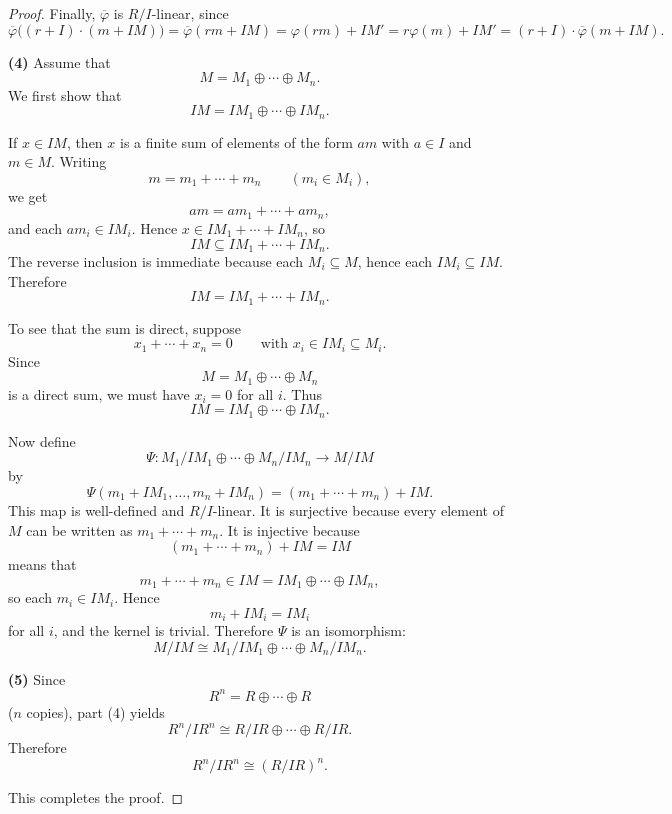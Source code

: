 \begin{proof}
    Finally, $\overline{\varphi}$ is $R/I$-linear, since
    \[
        \overline{\varphi}\bigl((r+I)\cdot (m+IM)\bigr)
        =\overline{\varphi}(rm+IM)
        =\varphi(rm)+IM'
        =r\varphi(m)+IM'
        =(r+I)\cdot \overline{\varphi}(m+IM).
    \]

    \textbf{(4)} Assume that
    \[
        M=M_1\oplus\cdots\oplus M_n.
    \]
    We first show that
    \[
        IM=IM_1\oplus\cdots\oplus IM_n.
    \]

    If $x\in IM$, then $x$ is a finite sum of elements of the form $am$ with $a\in I$ and $m\in M$. Writing
    \[
        m=m_1+\cdots+m_n
        \qquad (m_i\in M_i),
    \]
    we get
    \[
        am=am_1+\cdots+am_n,
    \]
    and each $am_i\in IM_i$. Hence $x\in IM_1+\cdots+IM_n$, so
    \[
        IM\subseteq IM_1+\cdots+IM_n.
    \]
    The reverse inclusion is immediate because each $M_i\subseteq M$, hence each $IM_i\subseteq IM$. Therefore
    \[
        IM=IM_1+\cdots+IM_n.
    \]

    To see that the sum is direct, suppose
    \[
        x_1+\cdots+x_n=0
        \qquad\text{with } x_i\in IM_i\subseteq M_i.
    \]
    Since
    \[
        M=M_1\oplus\cdots\oplus M_n
    \]
    is a direct sum, we must have $x_i=0$ for all $i$. Thus
    \[
        IM=IM_1\oplus\cdots\oplus IM_n.
    \]

    Now define
    \[
        \Psi:M_1/IM_1\oplus\cdots\oplus M_n/IM_n\to M/IM
    \]
    by
    \[
        \Psi(m_1+IM_1,\dots,m_n+IM_n)
        =(m_1+\cdots+m_n)+IM.
    \]
    This map is well-defined and $R/I$-linear. It is surjective because every element of $M$ can be written as $m_1+\cdots+m_n$. It is injective because
    \[
        (m_1+\cdots+m_n)+IM=IM
    \]
    means that
    \[
        m_1+\cdots+m_n\in IM=IM_1\oplus\cdots\oplus IM_n,
    \]
    so each $m_i\in IM_i$. Hence
    \[
        m_i+IM_i=IM_i
    \]
    for all $i$, and the kernel is trivial. Therefore $\Psi$ is an isomorphism:
    \[
        M/IM \cong M_1/IM_1 \oplus \cdots \oplus M_n/IM_n.
    \]

    \textbf{(5)} Since
    \[
        R^n=R\oplus\cdots\oplus R
    \]
    ($n$ copies), part (4) yields
    \[
        R^n/IR^n \cong R/IR \oplus \cdots \oplus R/IR.
    \]
    Therefore
    \[
        R^n/IR^n \cong (R/IR)^n.
    \]

    This completes the proof.
\end{proof}

